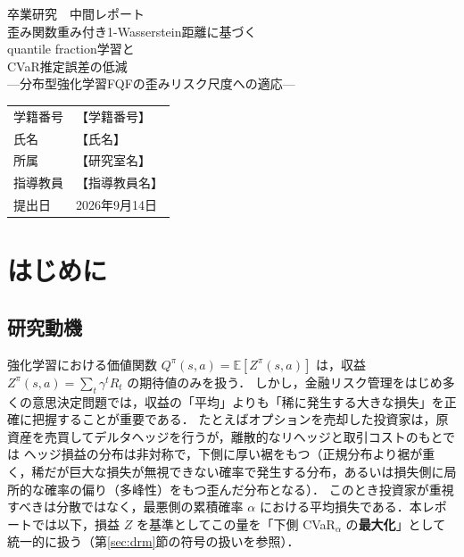 \documentclass[a4paper,10pt]{jsarticle}
\title{\vspace{-1cm}}
\author{}
\date{}
\theoremstyle{definition}
\newcommand{\E}{\mathbb{E}}
\begin{document}
\begin{titlepage}
\begin{center}
\vspace*{3cm}
{\LARGE 卒業研究　中間レポート}\\[1.5cm]
{\Large 歪み関数重み付き1-Wasserstein距離に基づく\\[0.3cm]
quantile fraction学習と\\[0.3cm]
CVaR推定誤差の低減}\\[0.6cm]
{\large ---分布型強化学習FQFの歪みリスク尺度への適応---}\\[3cm]

\begin{tabular}{ll}
学籍番号 & 【学籍番号】\\[0.3cm]
氏名 & 【氏名】\\[0.3cm]
所属 & 【研究室名】\\[0.3cm]
指導教員 & 【指導教員名】\\[0.3cm]
提出日 & 2026年9月14日\\
\end{tabular}
\vfill
\end{center}
\end{titlepage}

\tableofcontents
\newpage

\section{はじめに}
\label{sec:intro}

\subsection{研究動機}
強化学習における価値関数 $Q^\pi(s,a)=\E[Z^\pi(s,a)]$ は，収益 $Z^\pi(s,a)=\sum_t\gamma^t R_t$ の期待値のみを扱う．
しかし，金融リスク管理をはじめ多くの意思決定問題では，収益の「平均」よりも「稀に発生する大きな損失」を正確に把握することが重要である．
たとえばオプションを売却した投資家は，原資産を売買してデルタヘッジを行うが，離散的なリヘッジと取引コストのもとでは
ヘッジ損益の分布は非対称で，下側に厚い裾をもつ（正規分布より裾が重く，稀だが巨大な損失が無視できない確率で発生する分布，あるいは損失側に局所的な確率の偏り（多峰性）をもつ歪んだ分布となる）．
このとき投資家が重視すべきは分散ではなく，最悪側の累積確率 $\alpha$ における平均損失である．本レポートでは以下，損益 $Z$ を基準としてこの量を「下側 CVaR$_\alpha$ の\textbf{最大化}」として統一的に扱う（第\ref{sec:drm}節の符号の扱いを参照）\cite{rockafellar2000cvar}．
\end{document}
